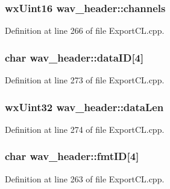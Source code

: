 \subsubsection[{\texorpdfstring{channels}{channels}}]{\setlength{\rightskip}{0pt plus 5cm}wx\+Uint16 wav\+\_\+header\+::channels}\hypertarget{structwav__header_aefcdce3cf6cf96d6263206f00044c45c}{}\label{structwav__header_aefcdce3cf6cf96d6263206f00044c45c}


Definition at line 266 of file Export\+C\+L.\+cpp.

\subsubsection[{\texorpdfstring{data\+ID}{dataID}}]{\setlength{\rightskip}{0pt plus 5cm}char wav\+\_\+header\+::data\+ID\mbox{[}4\mbox{]}}\hypertarget{structwav__header_a7a5f24b94773641e47e56628e106a280}{}\label{structwav__header_a7a5f24b94773641e47e56628e106a280}


Definition at line 273 of file Export\+C\+L.\+cpp.

\subsubsection[{\texorpdfstring{data\+Len}{dataLen}}]{\setlength{\rightskip}{0pt plus 5cm}wx\+Uint32 wav\+\_\+header\+::data\+Len}\hypertarget{structwav__header_adc7cd5aee29ab313405e0c1730320afb}{}\label{structwav__header_adc7cd5aee29ab313405e0c1730320afb}


Definition at line 274 of file Export\+C\+L.\+cpp.

\subsubsection[{\texorpdfstring{fmt\+ID}{fmtID}}]{\setlength{\rightskip}{0pt plus 5cm}char wav\+\_\+header\+::fmt\+ID\mbox{[}4\mbox{]}}\hypertarget{structwav__header_a00d73430c6209f3910251093a1d77c5e}{}\label{structwav__header_a00d73430c6209f3910251093a1d77c5e}


Definition at line 263 of file Export\+C\+L.\+cpp.

